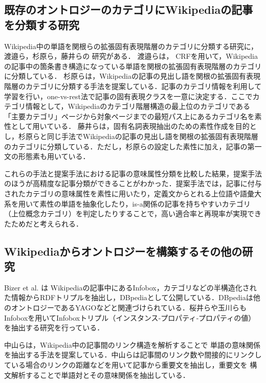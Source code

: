 \documentclass[japanese]{jnlp_1.4}
\begin{document}
\subsection{既存のオントロジーのカテゴリにWikipediaの記事を分類する研究}

Wikipedia中の単語を関根らの拡張固有表現階層のカテゴリに分類する研究に，
渡邉ら\citeyear{Watanabe}，杉原ら\citeyear{Sugihara}，藤井ら\citeyear{Fujii}の
研究がある．
渡邉らは，
CRFを用いて，Wikipediaの記事中の箇条書き構造になっている単語を関根の拡張固有表現階層のカテゴリに分類している．
杉原ら\citeyear{Sugihara}は，Wikipediaの記事の見出し語を関根の拡張固有表現階層のカテゴリに分類する手法を提案している．記事のカテゴリ情報を利用して学習を行い，one-vs-rest法で記事の固有表現クラスを一意に決定する．ここでカテゴリ情報として，Wikipediaのカテゴリ階層構造の最上位のカテゴリである「主要カテゴリ」ページから対象ページまでの最短パス上にあるカテゴリ名を素性として用いている．
藤井らは，固有名詞表現抽出のための素性作成を目的とし，杉原らと同じ手法でWikipediaの記事の見出し語を関根の拡張固有表現階層のカテゴリに分類している．ただし，杉原らの設定した素性に加え，記事の第一文の形態素も用いている．

これらの手法と提案手法における記事の意味属性分類を比較した結果，提案手法のほうが高精度な記事分類ができることがわかった．提案手法では，記事に付与されたカテゴリの意味属性を素性に用いたり，定義文からとれる上位語や語彙大系を用いて素性の単語を抽象化したり，is-a関係の記事を持ちやすいカテゴリ（上位概念カテゴリ）を判定したりすることで，高い適合率と再現率が実現できたためだと考えられる．


\subsection{Wikipediaからオントロジーを構築するその他の研究}

Bizer et al. \citeyear{Bizer}は Wikipediaの記事中にあるInfobox，カテゴリなどの半構造化された情報からRDFトリプルを抽出し，DBpediaとして公開している．DBpediaは他のオントロジーであるYAGOなどと関連づけられている．桜井ら\citeyear{Sakurai}や玉川ら\citeyear{Tamagawa}もInfoboxを用いてInfoboxトリプル（インスタンス‐プロパティ‐プロパティの値）を抽出する研究を行っている．

中山ら\citeyear{Nakayama}は，Wikipedia中の記事間のリンク構造を解析することで
単語の意味関係を抽出する手法を提案している．中山らは記事間のリンク数や間接的にリンクしている場合のリンクの距離などを用いて記事から重要文を抽出し，重要文を
構文解析することで単語対とその意味関係を抽出している．
\end{document}
